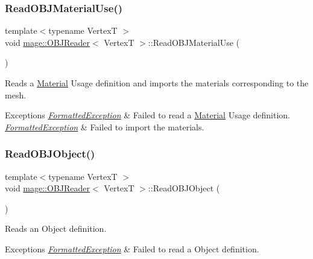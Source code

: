 \subsubsection{\texorpdfstring{Read\+O\+B\+J\+Material\+Use()}{ReadOBJMaterialUse()}}
{\footnotesize\ttfamily template$<$typename VertexT $>$ \\
void \hyperlink{classmage_1_1_o_b_j_reader}{mage\+::\+O\+B\+J\+Reader}$<$ VertexT $>$\+::Read\+O\+B\+J\+Material\+Use (\begin{DoxyParamCaption}{ }\end{DoxyParamCaption})\hspace{0.3cm}{\ttfamily [private]}}

Reads a \hyperlink{classmage_1_1_material}{Material} Usage definition and imports the materials corresponding to the mesh.


\begin{DoxyExceptions}{Exceptions}
{\em \hyperlink{classmage_1_1_formatted_exception}{Formatted\+Exception}} & Failed to read a \hyperlink{classmage_1_1_material}{Material} Usage definition. \\
\hline
{\em \hyperlink{classmage_1_1_formatted_exception}{Formatted\+Exception}} & Failed to import the materials. \\
\hline
\end{DoxyExceptions}
\hypertarget{classmage_1_1_o_b_j_reader_afc3f17024a006cce3b7869ca8c6a8f07}{}\label{classmage_1_1_o_b_j_reader_afc3f17024a006cce3b7869ca8c6a8f07} 
\subsubsection{\texorpdfstring{Read\+O\+B\+J\+Object()}{ReadOBJObject()}}
{\footnotesize\ttfamily template$<$typename VertexT $>$ \\
void \hyperlink{classmage_1_1_o_b_j_reader}{mage\+::\+O\+B\+J\+Reader}$<$ VertexT $>$\+::Read\+O\+B\+J\+Object (\begin{DoxyParamCaption}{ }\end{DoxyParamCaption})\hspace{0.3cm}{\ttfamily [private]}}

Reads an Object definition.


\begin{DoxyExceptions}{Exceptions}
{\em \hyperlink{classmage_1_1_formatted_exception}{Formatted\+Exception}} & Failed to read a Object definition. \\
\hline
\end{DoxyExceptions}
\hypertarget{classmage_1_1_o_b_j_reader_a2dd830c506ffbfbcd932b9bf75a35c56}{}\label{classmage_1_1_o_b_j_reader_a2dd830c506ffbfbcd932b9bf75a35c56} 
